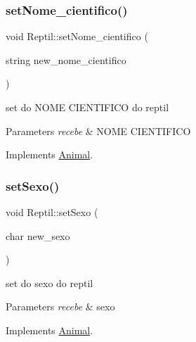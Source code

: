 \mbox{\label{class_reptil_afc4ae50f9acd8b35d0769e56fdc451ff}} 
\subsubsection{\texorpdfstring{setNome\_cientifico()}{setNome\_cientifico()}}
{\footnotesize\ttfamily void Reptil\+::set\+Nome\+\_\+cientifico (\begin{DoxyParamCaption}\item[{string}]{new\+\_\+nome\+\_\+cientifico }\end{DoxyParamCaption})\hspace{0.3cm}{\ttfamily [virtual]}}



set do N\+O\+ME C\+I\+E\+N\+T\+I\+F\+I\+CO do reptil 


\begin{DoxyParams}{Parameters}
{\em recebe} & N\+O\+ME C\+I\+E\+N\+T\+I\+F\+I\+CO \\
\hline
\end{DoxyParams}


Implements \mbox{\hyperlink{class_animal}{Animal}}.

\mbox{\label{class_reptil_a91d7897209aea3a570cc56cd1e5384fc}} 
\subsubsection{\texorpdfstring{setSexo()}{setSexo()}}
{\footnotesize\ttfamily void Reptil\+::set\+Sexo (\begin{DoxyParamCaption}\item[{char}]{new\+\_\+sexo }\end{DoxyParamCaption})\hspace{0.3cm}{\ttfamily [virtual]}}



set do sexo do reptil 


\begin{DoxyParams}{Parameters}
{\em recebe} & sexo \\
\hline
\end{DoxyParams}


Implements \mbox{\hyperlink{class_animal}{Animal}}.

